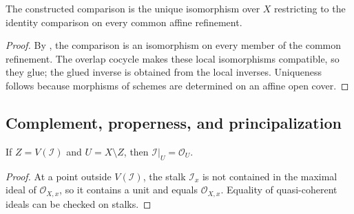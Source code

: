 \begin{proposition}
  \label{prop:nagata-global-blowup-cover-independent}
  \leanok

  The constructed comparison is the unique isomorphism over $X$ restricting
  to the identity comparison on every common affine refinement.
\end{proposition}

\begin{proof}
  \leanok
  By , the comparison is an
  isomorphism on every member of the common refinement.  The overlap cocycle
  makes these local isomorphisms compatible, so they glue; the glued inverse
  is obtained from the local inverses.  Uniqueness follows because morphisms
  of schemes are determined on an affine open cover.
\end{proof}

\subsection{Complement, properness, and principalization}

\begin{lemma}
  \label{lemma:nagata-ideal-unit-off-support}
  \leanok

  If $Z=V(\mathcal I)$ and $U=X\setminus Z$, then
  $\mathcal I|_U=\mathcal O_U$.
\end{lemma}

\begin{proof}
  \leanok
  At a point outside $V(\mathcal I)$, the stalk $\mathcal I_x$ is not
  contained in the maximal ideal of $\mathcal O_{X,x}$, so it contains a unit
  and equals $\mathcal O_{X,x}$.  Equality of quasi-coherent ideals can be
  checked on stalks.
\end{proof}

